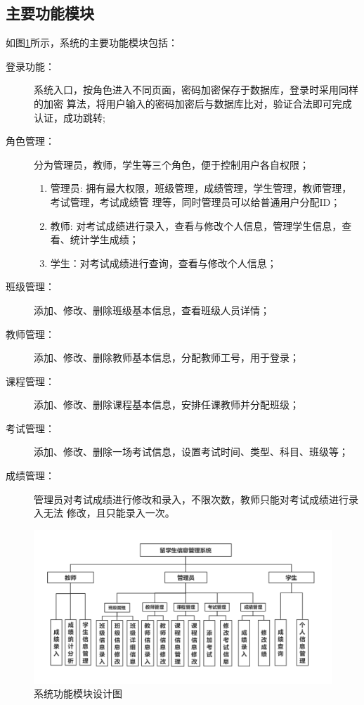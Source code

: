 \documentclass{ede}
\begin{document}
\subsection{主要功能模块}

如图\ref{fig:function}所示，系统的主要功能模块包括：
\begin{description}
\item [登录功能：] 系统入口，按角色进入不同页面，密码加密保存于数据库，登录时采用同样的加密
  算法，将用户输入的密码加密后与数据库比对，验证合法即可完成认证，成功跳转;
\item [角色管理：] 分为管理员，教师，学生等三个角色，便于控制用户各自权限；
  \begin{enumerate}
  \item 管理员: 拥有最大权限，班级管理，成绩管理，学生管理，教师管理，考试管理，考试成绩管
    理等，同时管理员可以给普通用户分配ID；
  \item 教师: 对考试成绩进行录入，查看与修改个人信息，管理学生信息，查看、统计学生成绩；
  \item 学生：对考试成绩进行查询，查看与修改个人信息；
  \end{enumerate}
\item [班级管理：] 添加、修改、删除班级基本信息，查看班级人员详情；
\item [教师管理：] 添加、修改、删除教师基本信息，分配教师工号，用于登录；
\item [课程管理：] 添加、修改、删除课程基本信息，安排任课教师并分配班级；
\item [考试管理：] 添加、修改、删除一场考试信息，设置考试时间、类型、科目、班级等；
\item [成绩管理：] 管理员对考试成绩进行修改和录入，不限次数，教师只能对考试成绩进行录入无法
  修改，且只能录入一次。
\end{description}

\begin{figure}%
  \centering
  \includegraphics [width=.9\columnwidth]{./img/function}      
  \caption{系统功能模块设计图}\label{fig:function}
\end{figure}
\end{document}
